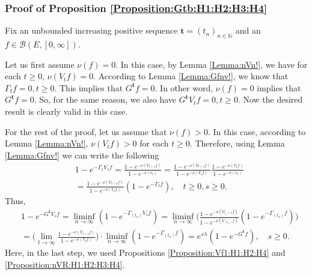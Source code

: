 \documentclass[12pt,a4paper]{amsart}
\numberwithin{equation}{section}
\theoremstyle{plain}
\theoremstyle{definition}
\theoremstyle{remark}
\begin{document}
\subsubsection{Proof of Proposition \ref{Proposition:Gtb:H1:H2:H3:H4}}
Fix an unbounded increasing positive sequence $\mathbf t = (t_n)_{n\in \mathbb N}$ and an $f\in \mathcal B(E,[0,\infty])$.

Let us first assume $\nu(f)=0$.
In this case, by Lemma \ref{Lemma:nVn!}, we have for each $t\geq 0$, $\nu(V_tf) = 0$.
According to Lemma \ref{Lemma:Gfnv!}, we know that $\Gamma_t f=0,t\geq 0$.
This implies that $G^{\mathbf t}f = 0$.
In other word, $\nu(f) = 0$ implies that $G^\mathbf tf = 0$.
So, for the same reason, we also have $G^{\mathbf t}V_t f = 0, t\geq 0$.
Now the desired result is clearly valid in this case.

For the rest of the proof, let us assume that $\nu(f) > 0$.
In this case, according to Lemma \ref{Lemma:nVn!}, $\nu(V_tf)>0$ for each $t\geq 0$.
Therefore, using Lemma \ref{Lemma:Gfnv!} we can write the following
\begin{align}
 & 1 - e^{- \Gamma_t V_s f}
 = \frac{ 1 - e^{- \nu(V_{t+s} f)} }{ 1 - e^{- \nu(v_t)}}
 = \frac{ 1 - e^{- \nu(V_{t+s} f)} }{ 1 - e^{- \nu(V_tf)}} \frac{ 1 - e^{ - \nu(V_tf)}}{ 1 - e^{- \nu(v_t)}}
 \\ & = \frac{ 1 - e^{- \nu(V_{t+s} f)} }{ 1 - e^{- \nu(V_tf)}} ( 1 - e^{- \Gamma_t f}),
 \quad t\geq 0, s \geq 0.
 \end{align}
Thus,
\begin{align}
 & 1 - e^{- G^{\mathbf t} V_s f}
 = \liminf_{n\to \infty} ( 1 - e^{- \Gamma_{(t_n)} V_s f})
 = \liminf_{n\to \infty} \Big( \frac{ 1 - e^{- \nu(V_{t_n+s}f)}}{ 1 - e^{- \nu(V_{(t_n)}f)}} (1 - e^{- \Gamma_{(t_n)} f}) \Big)
 \\& = \Big( \lim_{t \to \infty} \frac{ 1 - e^{- \nu(V_{t+s}f)}}{ 1 - e^{- \nu(V_{t}f)}} \Big) \cdot \liminf_{n\to \infty} (1 - e^{- \Gamma_{(t_n)} f} )
 = e^{s\lambda} (1 - e^{- G^{\mathbf t}f}), \quad s\geq 0.
 \end{align}
Here, in the last step, we used Propositions \ref{Proposition:Vf1:H1:H2:H4} and \ref{Proposition:nVR:H1:H2:H3:H4}.
\end{document}
